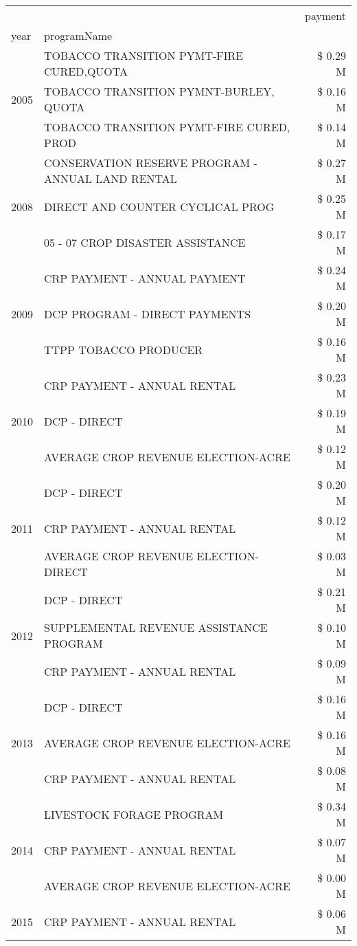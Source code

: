 \begin{tabular}{llr}
\toprule
 &  & payment \\
year & programName &  \\
\midrule
\multirow[t]{3}{*}{2005} & TOBACCO TRANSITION PYMT-FIRE CURED,QUOTA & \$ 0.29 M \\
 & TOBACCO TRANSITION PYMNT-BURLEY, QUOTA & \$ 0.16 M \\
 & TOBACCO TRANSITION PYMT-FIRE CURED, PROD & \$ 0.14 M \\
\cline{1-3}
\multirow[t]{3}{*}{2008} & CONSERVATION RESERVE PROGRAM - ANNUAL LAND RENTAL & \$ 0.27 M \\
 & DIRECT AND COUNTER CYCLICAL PROG & \$ 0.25 M \\
 & 05 - 07 CROP DISASTER ASSISTANCE & \$ 0.17 M \\
\cline{1-3}
\multirow[t]{3}{*}{2009} & CRP PAYMENT - ANNUAL PAYMENT & \$ 0.24 M \\
 & DCP PROGRAM - DIRECT PAYMENTS & \$ 0.20 M \\
 & TTPP TOBACCO PRODUCER & \$ 0.16 M \\
\cline{1-3}
\multirow[t]{3}{*}{2010} & CRP PAYMENT - ANNUAL RENTAL & \$ 0.23 M \\
 & DCP - DIRECT & \$ 0.19 M \\
 & AVERAGE CROP REVENUE ELECTION-ACRE & \$ 0.12 M \\
\cline{1-3}
\multirow[t]{3}{*}{2011} & DCP - DIRECT & \$ 0.20 M \\
 & CRP PAYMENT - ANNUAL RENTAL & \$ 0.12 M \\
 & AVERAGE CROP REVENUE ELECTION-DIRECT & \$ 0.03 M \\
\cline{1-3}
\multirow[t]{3}{*}{2012} & DCP - DIRECT & \$ 0.21 M \\
 & SUPPLEMENTAL REVENUE ASSISTANCE PROGRAM & \$ 0.10 M \\
 & CRP PAYMENT - ANNUAL RENTAL & \$ 0.09 M \\
\cline{1-3}
\multirow[t]{3}{*}{2013} & DCP - DIRECT & \$ 0.16 M \\
 & AVERAGE CROP REVENUE ELECTION-ACRE & \$ 0.16 M \\
 & CRP PAYMENT - ANNUAL RENTAL & \$ 0.08 M \\
\cline{1-3}
\multirow[t]{3}{*}{2014} & LIVESTOCK FORAGE PROGRAM & \$ 0.34 M \\
 & CRP PAYMENT - ANNUAL RENTAL & \$ 0.07 M \\
 & AVERAGE CROP REVENUE ELECTION-ACRE & \$ 0.00 M \\
\cline{1-3}
\multirow[t]{3}{*}{2015} & CRP PAYMENT - ANNUAL RENTAL & \$ 0.06 M \\

\end{tabular}
